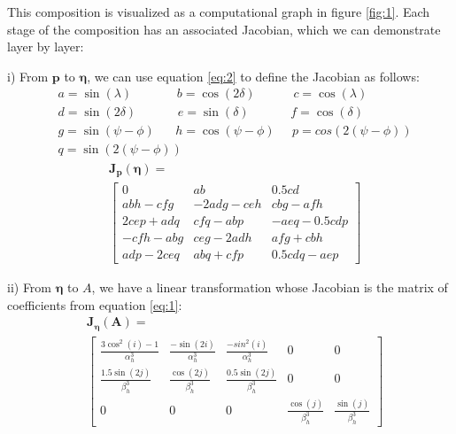 \documentclass[preprint]{seismica}
\begin{document}
    \noindent This composition is visualized as a computational graph in figure \ref{fig:1}.
    Each stage of the composition has an associated Jacobian, which we can demonstrate layer by layer:
    
    i) From $\bm{p}$ to $\bm{\eta}$, we can use equation \ref{eq:2} to define the Jacobian
    as follows:
    \begin{align*}
      &a = \sin(\lambda)\;\;\;\;\;\;\;\;\;\;\;\;\; b = \cos(2\delta)\;\;\;\;\;\;\;\;\;\;\; c = \cos(\lambda)\\
      &d = \sin(2\delta)\;\;\;\;\;\;\;\;\;\;\;\; e = \sin(\delta)\;\;\;\;\;\;\;\;\;\;\;\; f = \cos(\delta)\\
      &g = \sin(\psi - \phi)\;\;\;\;\;\; h = \cos(\psi - \phi)\;\;\;\;\; p = cos(2(\psi - \phi))\\
      &q = \sin(2(\psi - \phi))
    \end{align*}
    \begin{align} \label{eq:19}
      \nonumber&\bm{J_p}(\bm{\eta}) = \\
      &\begin{bmatrix}
        0         &ab         &0.5cd\\
        abh-cfg   &-2adg-ceh  &cbg-afh\\
        2cep+adq  &cfq-abp    &-aeq-0.5cdp\\
        -cfh-abg  &ceg-2adh   &afg+cbh\\
        adp-2ceq  &abq+cfp    &0.5cdq-aep
      \end{bmatrix}
    \end{align}

    ii) From $\bm{\eta}$ to $A$, we have a linear transformation whose Jacobian is the matrix
    of coefficients from equation \ref{eq:1}:
    \begin{align} \label{eq:20}
      \nonumber&\bm{J_\eta}(\bm{A}) = \\
      &\begin{bmatrix}
        \frac{3\cos^2(i)-1}{\alpha_h^3}    &\frac{-\sin(2i)}{\alpha_h^3}    &\frac{-sin^2(i)}{\alpha_h^3}   &0    &0\\
        \frac{1.5\sin(2j)}{\beta_h^3}      &\frac{\cos(2j)}{\beta_h^3}      &\frac{0.5\sin(2j)}{\beta_h^3}  &0    &0\\
        0         &0           &0        &\frac{\cos(j)}{\beta_h^3}       &\frac{\sin(j)}{\beta_h^3}
      \end{bmatrix}
    \end{align}
\end{document}
